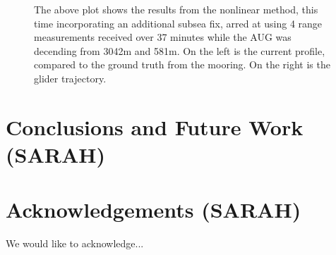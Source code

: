 \begin{figure}%
  \vspace{1.5in}
  \caption{The above plot shows the results from the nonlinear method, this time incorporating an additional subsea fix, arred at using 4 range measurements received over 37 minutes while the AUG was decending from 3042m and 581m. On the left is the current profile, compared to the ground truth from the mooring. On the right is the glider trajectory.}
  \label{fig.subseafix}
\end{figure}





\section{Conclusions and Future Work \textbf(SARAH)}


\section*{Acknowledgements \textbf(SARAH)}
We would like to acknowledge...
